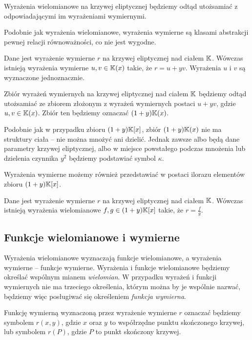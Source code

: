 \begin{remark}
Wyrażenia wielomianowe na krzywej eliptycznej
będziemy odtąd utożsamiać z odpowiadającymi im wyrażeniami wymiernymi.
\end{remark}

Podobnie jak wyrażenia wielomianowe,
wyrażenia wymierne są klasami abstrakcji pewnej relacji równoważności,
co nie jest wygodne.

\begin{theorem}
Dane jest wyrażenie wymierne $r$ na krzywej eliptycznej nad ciałem $\mathbb{K}$.
Wówczas istnieją wyrażenia wymierne $u, v \in \mathbb{K}(x)$ takie,
że $r = u + yv$.
Wyrażenia $u$ i $v$ są wyznaczone jednoznacznie.
\end{theorem}

\begin{remark}
Zbiór wyrażeń wymiernych na krzywej eliptycznej nad ciałem $\mathbb{K}$
będziemy odtąd utożsamiać ze zbiorem
złożonym z wyrażeń wymiernych postaci $u + yv$,
gdzie $u,v \in \mathbb{K}(x)$.
Zbiór ten będziemy oznaczać $(1 + y)\mathbb{K}(x)$.
\end{remark}

Podobnie jak w przypadku zbioru $(1 + y)\mathbb{K}[x]$,
zbiór $(1 + y)\mathbb{K}(x)$ nie ma struktury ciała --
nie można mnożyć ani dzielić.
Jednak zawsze albo będą dane parametry krzywej eliptycznej,
albo w miejsce powstałego podczas mnożenia lub dzielenia czynnika $y^2$
będziemy podstawiać symbol $\kappa$.

Wyrażenia wymierne możemy również przedstawiać w postaci ilorazu
elementów zbioru $(1 + y)\mathbb{K}[x]$.

\begin{theorem}
Dane jest wyrażenie wymierne $r$ na krzywej eliptycznej nad ciałem $\mathbb{K}$.
Wówczas istnieją wyrażenia wielomianowe $f, g \in (1 + y)\mathbb{K}[x]$ takie,
że $r = \frac{f}{g}$.
\end{theorem}

\subsection*{Funkcje wielomianowe i wymierne}

Wyrażenia wielomianowe wyznaczają funkcje wielomianowe,
a wyrażenia wymierne -- funkcje wymierne.
Wyrażenia i funkcje wielomianowe będziemy określać
wspólnym mianem \emph{wielomian}.
W przypadku wyrażeń i funkcji wymiernych nie ma trzeciego określenia,
którym można by je wspólnie nazwać,
będziemy więc posługiwać się określeniem \emph{funkcja wymierna}.

\begin{remark}
Funkcję wymierną wyznaczoną przez wyrażenie wymierne $r$
oznaczać będziemy symbolem $r(x, y)$,
gdzie $x$ oraz $y$ to współrzędne punktu skończonego krzywej,
lub symbolem $r(P)$, gdzie $P$ to punkt skończony krzywej.
\end{remark}

